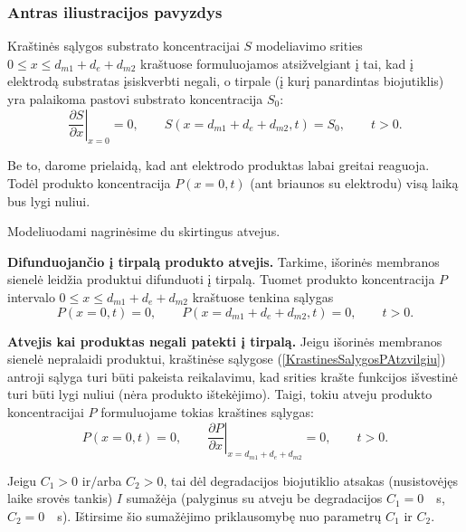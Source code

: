 \documentclass[a4paper,12pt]{article}
\begin{document}
\subsubsection{Antras iliustracijos pavyzdys}

Kraštinės sąlygos substrato koncentracijai $S$ modeliavimo srities $0 \leqslant x \leqslant d_{m1} + d_e + d_{m2}$ kraštuose formuluojamos
atsižvelgiant į tai, kad į elektrodą substratas įsiskverbti negali, o tirpale (į kurį panardintas biojutiklis) yra palaikoma pastovi substrato koncentracija $S_0$:
\begin{equation}
    \left. \frac{\partial S}{\partial x} \right|_{x=0}  =  0,  \qquad
    S( x = d_{m1} + d_e + d_{m2}, t )  =  S_0,  \qquad  t > 0.
    \label{KrastinesSalygosSAtzvilgiu}
\end{equation}

Be to, darome prielaidą, kad ant elektrodo produktas labai greitai reaguoja.
Todėl produkto koncentracija $P( x = 0 ,t )$ (ant briaunos su elektrodu) visą laiką bus lygi nuliui.

Modeliuodami nagrinėsime du skirtingus atvejus.

\medskip
\textbf{Difunduojančio į tirpalą produkto atvejis.}
Tarkime, išorinės membranos sienelė leidžia produktui difunduoti į tirpalą.
Tuomet produkto koncentracija $P$ intervalo $0 \leqslant x \leqslant d_{m1} + d_e + d_{m2}$ kraštuose tenkina sąlygas
\begin{equation}
    P( x = 0, t )  =  0,  \qquad
    P( x = d_{m1} + d_e + d_{m2}, t )  =  0,  \qquad  t > 0.
    \label{KrastinesSalygosPAtzvilgiu}
\end{equation}

\medskip
\textbf{Atvejis kai produktas negali patekti į tirpalą.}
Jeigu išorinės membranos sienelė nepralaidi produktui, kraštinėse sąlygose (\ref{KrastinesSalygosPAtzvilgiu}) antroji sąlyga turi būti pakeista reikalavimu,
kad srities krašte funkcijos išvestinė turi būti lygi nuliui (nėra produkto ištekėjimo).
Taigi, tokiu atveju produkto koncentracijai $P$ formuluojame tokias kraštines sąlygas:
\begin{equation}
    P( x = 0, t )  =  0,  \qquad
    \left. \frac{\partial P}{\partial x} \right|_{x=d_{m1}+d_e+d_{m2}}  =  0,  \qquad  t > 0.
    \label{AlternatyviosKrastinesSalygosPAtzvilgiu}
\end{equation}

Jeigu $C_1>0$ ir$/$arba $C_2>0$, tai dėl degradacijos biojutiklio atsakas (nusistovėjęs laike srovės tankis) $I$ sumažėja
(palyginus su atveju be degradacijos $C_1 ={}$\SI{0}{\per\second}, $C_2 ={}$\SI{0}{\per\second}).
Ištirsime šio sumažėjimo priklausomybę nuo parametrų $C_1$ ir $C_2$.
\end{document}
